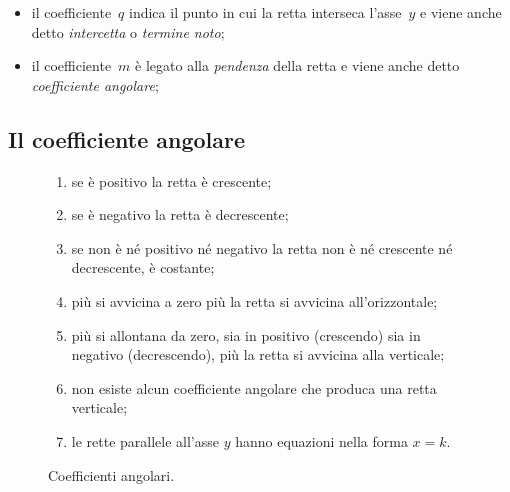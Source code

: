 \begin{itemize} [noitemsep]
 \item il coefficiente~\(q\) indica il punto in cui la retta interseca 
  l'asse~\(y\) e viene anche detto \emph{intercetta} o \emph{termine noto};
 \item il coefficiente~\(m\) è legato alla \emph{pendenza} della retta
  e viene anche detto \emph{coefficiente angolare};
\end{itemize}

\subsection{Il coefficiente angolare}


\begin{inaccessibleblock}
\begin{figure}[h]
\centering \hspace{-5mm}
\begin{minipage}{.58\textwidth}
\begin{enumerate} [nosep]
 \item se è positivo la retta è crescente;
 \item se è negativo la retta è decrescente;
 \item se non è né positivo né negativo la retta non è né crescente né
 decrescente, è costante;
 \item più si avvicina a zero più la retta si avvicina all'orizzontale;
 \item più si allontana da zero, sia in positivo (crescendo) sia in
  negativo (decrescendo), più la retta si avvicina alla verticale;
 \item non esiste alcun coefficiente angolare che produca 
  una retta verticale;
 \item le rette parallele all'asse \(y\) hanno equazioni nella forma \(x=k\).
\end{enumerate}
\end{minipage}
\hfill
\begin{minipage}{.38\textwidth}
\begin{center} \coeffang \end{center}
\caption{Coefficienti angolari.}\label{fig:coeffang}
\end{minipage}
\end{figure}
\end{inaccessibleblock}

